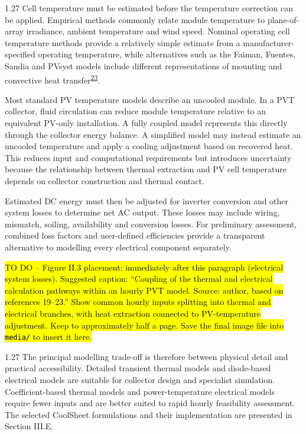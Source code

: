 \documentclass[12pt,letterpaper]{article}
\newcommand{\placeholder}[1]{\hl{#1}}
\DeclareRobustCommand{\citenum}[1]{\hyperlink{ref:#1}{#1}} %
\begin{document}
\begin{spacing}{1.27}
Cell temperature must be estimated before the temperature correction can be applied. Empirical methods commonly relate module temperature to plane-of-array irradiance, ambient temperature and wind speed. Nominal operating cell temperature methods provide a relatively simple estimate from a manufacturer-specified operating temperature, while alternatives such as the Faiman, Fuentes, Sandia and PVsyst models include different representations of mounting and convective heat transfer\textsuperscript{\citenum{23}}.\par

\vspace{0.15in}

Most standard PV temperature models describe an uncooled module. In a PVT collector, fluid circulation can reduce module temperature relative to an equivalent PV-only installation. A fully coupled model represents this directly through the collector energy balance. A simplified model may instead estimate an uncooled temperature and apply a cooling adjustment based on recovered heat. This reduces input and computational requirements but introduces uncertainty because the relationship between thermal extraction and PV cell temperature depends on collector construction and thermal contact.\par

\vspace{0.15in}

Estimated DC energy must then be adjusted for inverter conversion and other system losses to determine net AC output. These losses may include wiring, mismatch, soiling, availability and conversion losses. For preliminary assessment, combined loss factors and user-defined efficiencies provide a transparent alternative to modelling every electrical component separately.\par
\end{spacing}

\placeholder{TO DO -- Figure II.3 placement: immediately after this paragraph (electrical system losses). Suggested caption: ``Coupling of the thermal and electrical calculation pathways within an hourly PVT model. Source: author, based on references 19--23.'' Show common hourly inputs splitting into thermal and electrical branches, with heat extraction connected to PV-temperature adjustment. Keep to approximately half a page. Save the final image file into \texttt{media/} to insert it here.}

\begin{spacing}{1.27}
The principal modelling trade-off is therefore between physical detail and practical accessibility. Detailed transient thermal models and diode-based electrical models are suitable for collector design and specialist simulation. Coefficient-based thermal models and power-temperature electrical models require fewer inputs and are better suited to rapid hourly feasibility assessment. The selected CoolSheet formulations and their implementation are presented in Section III.E.\par
\end{spacing}
\end{document}

